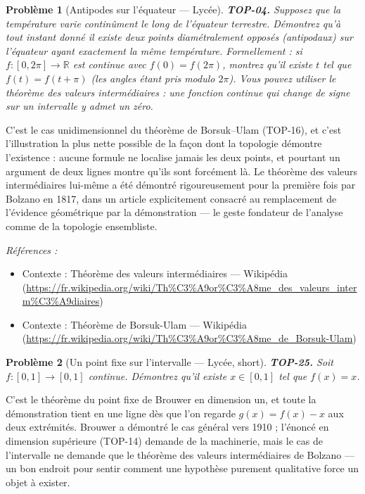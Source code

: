 \documentclass[11pt]{article}
\newtheorem{problem}{Problème}
\newenvironment{refs}{\par\small\noindent\emph{Références :}\begin{itemize}\setlength\itemsep{0pt}}{\end{itemize}\normalsize}
\begin{document}
\bigskip

\begin{problem}[{Antipodes sur l'équateur --- Lycée}]
\textbf{TOP-04.} Supposez que la température varie continûment le long de
l'équateur terrestre. Démontrez qu'à tout instant donné il existe deux points diamétralement opposés
(antipodaux) sur l'équateur ayant exactement la même température. Formellement : si
$ f : [0, 2\pi] \to \mathbb{R} $ est continue avec $ f(0) = f(2\pi) $, montrez qu'il existe
$ t $ tel que $ f(t) = f(t + \pi) $ (les angles étant pris modulo $ 2\pi $). Vous pouvez
utiliser le théorème des valeurs intermédiaires : une fonction continue qui change de signe sur un
intervalle y admet un zéro.
\end{problem}

\noindent C'est le cas unidimensionnel du théorème de Borsuk--Ulam (TOP-16), et c'est
l'illustration la plus nette possible de la façon dont la topologie démontre l'existence : aucune
formule ne localise jamais les deux points, et pourtant un argument de deux lignes montre qu'ils sont
forcément là. Le théorème des valeurs intermédiaires lui-même a été démontré rigoureusement pour la
première fois par Bolzano en 1817, dans un article explicitement consacré au remplacement de l'évidence
géométrique par la démonstration --- le geste fondateur de l'analyse comme de la topologie
ensembliste.

\begin{refs}
\item Contexte : Théorème des valeurs intermédiaires --- Wikipédia (\url{https://fr.wikipedia.org/wiki/Th%C3%A9or%C3%A8me_des_valeurs_interm%C3%A9diaires})
\item Contexte : Théorème de Borsuk-Ulam --- Wikipédia (\url{https://fr.wikipedia.org/wiki/Th%C3%A9or%C3%A8me_de_Borsuk-Ulam})
\end{refs}

\bigskip

\begin{problem}[{Un point fixe sur l'intervalle --- Lycée, short}]
\textbf{TOP-25.} Soit $ f : [0,1] \to [0,1] $ continue. Démontrez qu'il existe
$ x \in [0,1] $ tel que $ f(x) = x $.
\end{problem}

\noindent C'est le théorème du point fixe de Brouwer en dimension un, et toute la
démonstration tient en une ligne dès que l'on regarde $ g(x) = f(x) - x $ aux deux extrémités.
Brouwer a démontré le cas général vers 1910 ; l'énoncé en dimension supérieure (TOP-14) demande de la
machinerie, mais le cas de l'intervalle ne demande que le théorème des valeurs intermédiaires de
Bolzano --- un bon endroit pour sentir comment une hypothèse purement qualitative force un objet à
exister.
\end{document}
